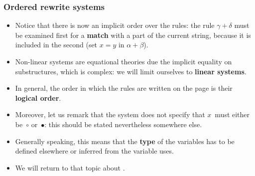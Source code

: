 \documentclass[compress,dvips,xcolor={dvipsnames},t]{beamer}
\begin{document}
\begin{frame}
  \frametitle{Ordered rewrite systems}

  \begin{itemize}

    \item Notice that there is now an implicit order over the rules:
      the rule \(\gamma+\delta\) must be examined first for a
      \textbf{match} with a part of the current string, because it is
      included in the second (set \(x=y\) in \(\alpha+\beta\)).

    \item Non\hyp{}linear systems are equational theories due the
      implicit equality on substructures, which is complex: we will
      limit ourselves to \textbf{linear systems}.

    \item In general, the order in which the rules are written on the
      page is their \textbf{logical order}.

    \item Moreover, let us remark that the system does not specify
      that \(x\)~must either be~\(\circ\) or~\(\bullet\): this should
      be stated nevertheless somewhere else.

    \item Generally speaking, this means that the \textbf{type} of the
      variables has to be defined elsewhere or inferred from the
      variable uses.

      \item We will return to that topic about \OCaml.

  \end{itemize}
\end{frame}
\end{document}
